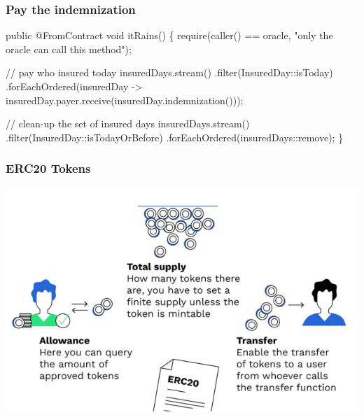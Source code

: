 \documentclass[11pt]{beamer}  %
\begin{document}
\begin{frame}[fragile]\frametitle{Pay the indemnization}

{\scriptsize\begin{semiverbatim}
public {\color{violet}@FromContract} void itRains() \{
  {\color{armygreen}require({\color{violet}caller()} == oracle, "only the oracle can call this method");}

  {\color{red}// pay who insured today}
  insuredDays.stream()
    .filter(InsuredDay::isToday)
    .forEachOrdered(insuredDay ->
          insuredDay.payer.{\color{blue}receive}(insuredDay.indemnization()));

  {\color{red}// clean-up the set of insured days}
  insuredDays.stream()
    .filter(InsuredDay::isTodayOrBefore)
    .forEachOrdered(insuredDays::remove);
\}
\end{semiverbatim}}

\end{frame}

\begin{frame}\frametitle{ERC20 Tokens}

  \begin{center}
    \includegraphics[scale=0.4,clip=false]{pictures/erc20_1.png}
  \end{center}
  
\end{frame}
\end{document}
